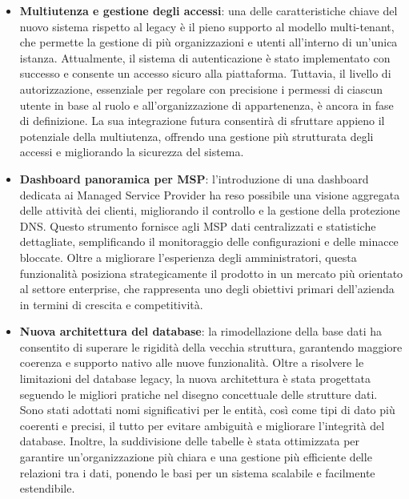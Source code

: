 \begin{itemize}
  \item \textbf{Multiutenza e gestione degli accessi}: una delle caratteristiche chiave del nuovo sistema rispetto al legacy è il pieno supporto al modello multi-tenant, che permette la gestione di più organizzazioni e utenti all’interno di un’unica istanza. Attualmente, il sistema di autenticazione è stato implementato con successo e consente un accesso sicuro alla piattaforma. Tuttavia, il livello di autorizzazione, essenziale per regolare con precisione i permessi di ciascun utente in base al ruolo e all’organizzazione di appartenenza, è ancora in fase di definizione. La sua integrazione futura consentirà di sfruttare appieno il potenziale della multiutenza, offrendo una gestione più strutturata degli accessi e migliorando la sicurezza del sistema.

  \item \textbf{Dashboard panoramica per MSP}: l’introduzione di una dashboard dedicata ai Managed Service Provider ha reso possibile una visione aggregata delle attività dei clienti, migliorando il controllo e la gestione della protezione DNS. Questo strumento fornisce agli MSP dati centralizzati e statistiche dettagliate, semplificando il monitoraggio delle configurazioni e delle minacce bloccate. Oltre a migliorare l’esperienza degli amministratori, questa funzionalità posiziona strategicamente il prodotto in un mercato più orientato al settore enterprise, che rappresenta uno degli obiettivi primari dell’azienda in termini di crescita e competitività.

  \item \textbf{Nuova architettura del database}: la rimodellazione della base dati ha consentito di superare le rigidità della vecchia struttura, garantendo maggiore coerenza e supporto nativo alle nuove funzionalità. Oltre a risolvere le limitazioni del database legacy, la nuova architettura è stata progettata seguendo le migliori pratiche nel disegno concettuale delle strutture dati. Sono stati adottati nomi significativi per le entità, così come tipi di dato più coerenti e precisi, il tutto per evitare ambiguità e migliorare l'integrità del database. Inoltre, la suddivisione delle tabelle è stata ottimizzata per garantire un'organizzazione più chiara e una gestione più efficiente delle relazioni tra i dati, ponendo le basi per un sistema scalabile e facilmente estendibile.


\end{itemize}
